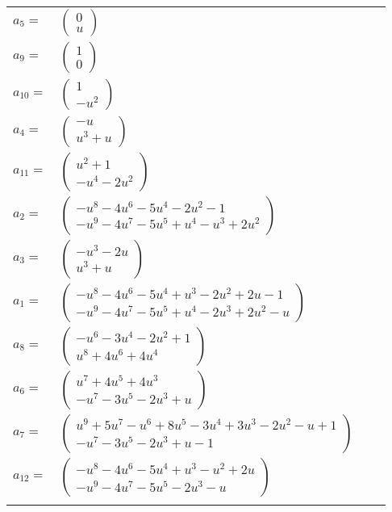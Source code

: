 \documentclass[1p]{elsarticle_modified}
\theoremstyle{definition}
\begin{document}
\begin{tabular}{m{7pt} m{180pt} m{7pt} m{180pt} }
\flushright $a_{5}=$&$\begin{pmatrix}0\\u\end{pmatrix}$ \\
\flushright $a_{9}=$&$\begin{pmatrix}1\\0\end{pmatrix}$ \\
\flushright $a_{10}=$&$\begin{pmatrix}1\\- u^2\end{pmatrix}$ \\
\flushright $a_{4}=$&$\begin{pmatrix}- u\\u^3+u\end{pmatrix}$ \\
\flushright $a_{11}=$&$\begin{pmatrix}u^2+1\\- u^4-2 u^2\end{pmatrix}$ \\
\flushright $a_{2}=$&$\begin{pmatrix}- u^8-4 u^6-5 u^4-2 u^2-1\\- u^9-4 u^7-5 u^5+u^4- u^3+2 u^2\end{pmatrix}$ \\
\flushright $a_{3}=$&$\begin{pmatrix}- u^3-2 u\\u^3+u\end{pmatrix}$ \\
\flushright $a_{1}=$&$\begin{pmatrix}- u^8-4 u^6-5 u^4+u^3-2 u^2+2 u-1\\- u^9-4 u^7-5 u^5+u^4-2 u^3+2 u^2- u\end{pmatrix}$ \\
\flushright $a_{8}=$&$\begin{pmatrix}- u^6-3 u^4-2 u^2+1\\u^8+4 u^6+4 u^4\end{pmatrix}$ \\
\flushright $a_{6}=$&$\begin{pmatrix}u^7+4 u^5+4 u^3\\- u^7-3 u^5-2 u^3+u\end{pmatrix}$ \\
\flushright $a_{7}=$&$\begin{pmatrix}u^9+5 u^7- u^6+8 u^5-3 u^4+3 u^3-2 u^2- u+1\\- u^7-3 u^5-2 u^3+u-1\end{pmatrix}$ \\
\flushright $a_{12}=$&$\begin{pmatrix}- u^8-4 u^6-5 u^4+u^3- u^2+2 u\\- u^9-4 u^7-5 u^5-2 u^3- u\end{pmatrix}$\\&\end{tabular}
\end{document}
